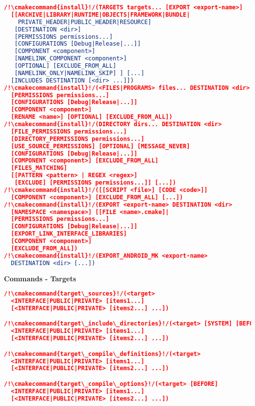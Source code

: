 \documentclass{article}
\newcommand{\cmakecommand}[1]{{\href{https://cmake.org/cmake/help/v3.20/command/#1.html}{#1}}}
\begin{document}
\begin{minipage}[t]{0.18\linewidth}
\begin{lstlisting}[language=CMake]
/!\cmakecommand{install}!/(TARGETS targets... [EXPORT <export-name>]
  [[ARCHIVE|LIBRARY|RUNTIME|OBJECTS|FRAMEWORK|BUNDLE|
    PRIVATE_HEADER|PUBLIC_HEADER|RESOURCE]
   [DESTINATION <dir>]
   [PERMISSIONS permissions...]
   [CONFIGURATIONS [Debug|Release|...]]
   [COMPONENT <component>]
   [NAMELINK_COMPONENT <component>]
   [OPTIONAL] [EXCLUDE_FROM_ALL]
   [NAMELINK_ONLY|NAMELINK_SKIP] ] [...]
  [INCLUDES DESTINATION [<dir> ...]])
/!\cmakecommand{install}!/(<FILES|PROGRAMS> files... DESTINATION <dir>
  [PERMISSIONS permissions...]
  [CONFIGURATIONS [Debug|Release|...]]
  [COMPONENT <component>]
  [RENAME <name>] [OPTIONAL] [EXCLUDE_FROM_ALL])
/!\cmakecommand{install}!/(DIRECTORY dirs... DESTINATION <dir>
  [FILE_PERMISSIONS permissions...]
  [DIRECTORY_PERMISSIONS permissions...]
  [USE_SOURCE_PERMISSIONS] [OPTIONAL] [MESSAGE_NEVER]
  [CONFIGURATIONS [Debug|Release|...]]
  [COMPONENT <component>] [EXCLUDE_FROM_ALL]
  [FILES_MATCHING]
  [[PATTERN <pattern> | REGEX <regex>]
   [EXCLUDE] [PERMISSIONS permissions...]] [...])
/!\cmakecommand{install}!/([[SCRIPT <file>] [CODE <code>]]
  [COMPONENT <component>] [EXCLUDE_FROM_ALL] [...])
/!\cmakecommand{install}!/(EXPORT <export-name> DESTINATION <dir>
  [NAMESPACE <namespace>] [[FILE <name>.cmake]|
  [PERMISSIONS permissions...]
  [CONFIGURATIONS [Debug|Release|...]]
  [EXPORT_LINK_INTERFACE_LIBRARIES]
  [COMPONENT <component>]
  [EXCLUDE_FROM_ALL])
/!\cmakecommand{install}!/(EXPORT_ANDROID_MK <export-name>
  DESTINATION <dir> [...])
\end{lstlisting}

\textbf{Commands - Targets}
\begin{lstlisting}[language=CMake]
/!\cmakecommand{target\_sources}!/(<target>
  <INTERFACE|PUBLIC|PRIVATE> [items1...]
  [<INTERFACE|PUBLIC|PRIVATE> [items2...] ...])

/!\cmakecommand{target\_include\_directories}!/(<target> [SYSTEM] [BEFORE]
  <INTERFACE|PUBLIC|PRIVATE> [items1...]
  [<INTERFACE|PUBLIC|PRIVATE> [items2...] ...])

/!\cmakecommand{target\_compile\_definitions}!/(<target>
  <INTERFACE|PUBLIC|PRIVATE> [items1...]
  [<INTERFACE|PUBLIC|PRIVATE> [items2...] ...])

/!\cmakecommand{target\_compile\_options}!/(<target> [BEFORE]
  <INTERFACE|PUBLIC|PRIVATE> [items1...]
  [<INTERFACE|PUBLIC|PRIVATE> [items2...] ...])


\end{lstlisting}
\end{minipage}
\end{document}
